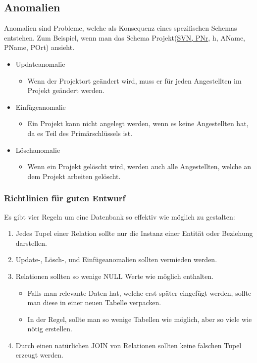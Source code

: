 \documentclass{article}
\begin{document}
	\subsection{Anomalien}
	Anomalien sind Probleme, welche als Konsequenz eines spezifischen Schemas entstehen. Zum Beispiel, wenn man das Schema Projekt(\underline{SVN, PNr}, h, AName, PName, POrt) ansieht.
	\begin{itemize}
		\item{Updateanomalie}
		\begin{itemize}
			\item{Wenn der Projektort geändert wird, muss er für jeden Angestellten im Projekt geändert werden.}
		\end{itemize}
		\item{Einfügeanomalie}
		\begin{itemize}
			\item{Ein Projekt kann nicht angelegt werden, wenn es keine Angestellten hat, da es Teil des Primärschlüssels ist.}
		\end{itemize}
		\item{Löschanomalie}
		\begin{itemize}
			\item{Wenn ein Projekt gelöscht wird, werden auch alle Angestellten, welche an dem Projekt arbeiten gelöscht.}
		\end{itemize}
	\end{itemize}
	\subsubsection{Richtlinien für guten Entwurf}
	Es gibt vier Regeln um eine Datenbank so effektiv wie möglich zu gestalten:
	\begin{enumerate}
		\item{Jedes Tupel einer Relation sollte nur die Instanz einer Entität oder Beziehung darstellen.}
		\item{Update-, Lösch-, und Einfügeanomalien sollten vermieden werden.}
		\item{Relationen sollten so wenige NULL Werte wie möglich enthalten.}
		\begin{itemize}
			\item{Falls man relevante Daten hat, welche erst später eingefügt werden, sollte man diese in einer neuen Tabelle verpacken.}
			\item{In der Regel, sollte man so wenige Tabellen wie möglich, aber so viele wie nötig erstellen.}
		\end{itemize}
		\item{Durch einen natürlichen JOIN von Relationen sollten keine falschen Tupel erzeugt werden.}
	\end{enumerate}
\end{document}
